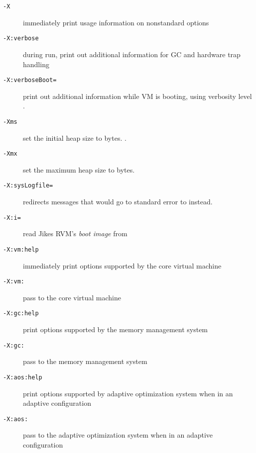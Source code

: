 \begin{description}
\item[{\tt -X}]
immediately print usage information on nonstandard options

\item[{\tt -X:verbose}]
during run, print out additional information for GC and hardware trap handling

\item[{\tt -X:verboseBoot=}]
print out additional information while VM is booting, using verbosity
level .

\item[{\tt -Xms\Mlsq{}\Mrsq{}}]
set the initial heap size to  bytes.
.

\item[{\tt -Xmx\Mlsq{}\Mrsq{}}]
set the maximum heap size to  bytes.


\item[{\tt -X:sysLogfile=}]
redirects messages that would go to standard error to  instead.

\item[{\tt -X:i=}]
read Jikes RVM's \emph{boot image} from 

\item[{\tt -X:vm\Mlsq{}:help\Mrsq{}}]
immediately print options supported by the core virtual machine

\item[{\tt -X:vm:}]
pass  to the core virtual machine

\item[{\tt -X:gc\Mlsq{}:help\Mrsq}]
print options supported by the memory management system

\item[{\tt -X:gc:}]
pass  to the memory management system

\item[{\tt -X:aos\Mlsq{}:help\Mrsq{}}]
print options supported by adaptive optimization system when in an
adaptive configuration

\item[{\tt -X:aos:}]
pass  to the adaptive optimization system when in an adaptive configuration


\end{description}
